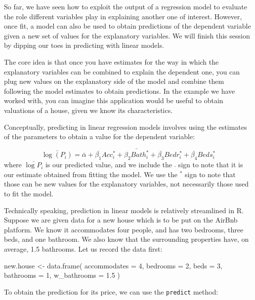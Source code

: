 \documentclass[
]{book}
\newenvironment{Shaded}{\begin{snugshade}}{\end{snugshade}}
\newcommand{\AttributeTok}[1]{\textcolor[rgb]{0.77,0.63,0.00}{#1}}
\newcommand{\DecValTok}[1]{\textcolor[rgb]{0.00,0.00,0.81}{#1}}
\newcommand{\FloatTok}[1]{\textcolor[rgb]{0.00,0.00,0.81}{#1}}
\newcommand{\FunctionTok}[1]{\textcolor[rgb]{0.00,0.00,0.00}{#1}}
\newcommand{\NormalTok}[1]{#1}
\newcommand{\OtherTok}[1]{\textcolor[rgb]{0.56,0.35,0.01}{#1}}
\begin{document}
So far, we have seen how to exploit the output of a regression model to evaluate the role different variables play in explaining another one of interest. However, once fit, a model can also be used to obtain predictions of the dependent variable given a new set of values for the explanatory variables. We will finish this session by dipping our toes in predicting with linear models.

The core idea is that once you have estimates for the way in which the explanatory variables can be combined to explain the dependent one, you can plug new values on the explanatory side of the model and combine them following the model estimates to obtain predictions. In the example we have worked with, you can imagine this application would be useful to obtain valuations of a house, given we know its characteristics.

Conceptually, predicting in linear regression models involves using the estimates of the parameters to obtain a value for the dependent variable:

\[
\bar{\log(P_i)} = \bar{\alpha} + \bar{\beta_1} Acc_i^* + \bar{\beta_2 Bath_i^*} + \bar{\beta_3} Bedr_i^* + \bar{\beta_4} Beds_i^*
\]
where \(\bar{\log{P_i}}\) is our predicted value, and we include the \(\bar{}\) sign to note that it is our estimate obtained from fitting the model. We use the \(^*\) sign to note that those can be new values for the explanatory variables, not necessarily those used to fit the model.

Technically speaking, prediction in linear models is relatively streamlined in R. Suppose we are given data for a new house which is to be put on the AirBnb platform. We know it accommodates four people, and has two bedrooms, three beds, and one bathroom. We also know that the surrounding properties have, on average, 1.5 bathrooms. Let us record the data first:

\begin{Shaded}
\begin{Highlighting}[]
\NormalTok{new.house }\OtherTok{\textless{}{-}} \FunctionTok{data.frame}\NormalTok{(}
  \AttributeTok{accommodates =} \DecValTok{4}\NormalTok{, }
  \AttributeTok{bedrooms =} \DecValTok{2}\NormalTok{,}
  \AttributeTok{beds =} \DecValTok{3}\NormalTok{,}
  \AttributeTok{bathrooms =} \DecValTok{1}\NormalTok{,}
  \AttributeTok{w\_bathrooms =} \FloatTok{1.5}
\NormalTok{)}
\end{Highlighting}
\end{Shaded}

To obtain the prediction for its price, we can use the \texttt{predict} method:
\end{document}
